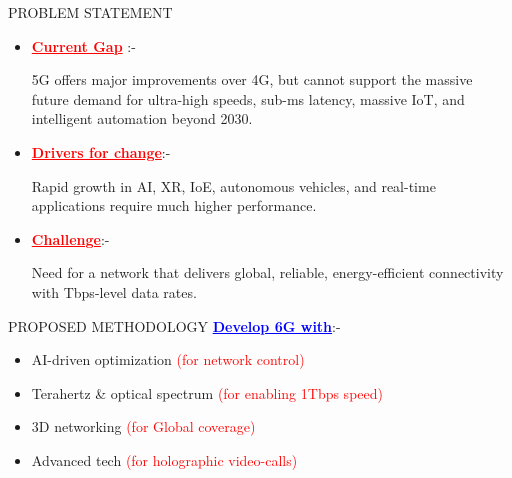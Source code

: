 \documentclass{beamer}
\begin{document}
\begin{frame}{PROBLEM STATEMENT}
\begin{itemize}
    \item \textcolor{red}{\underline{\textbf{Current Gap}}} :-
    
    5G offers major improvements over 4G, but cannot support the massive future demand for ultra-high speeds, sub-ms latency, massive IoT, and intelligent automation beyond 2030.
    \item \textcolor{red}{\underline{\textbf{Drivers for change}}}:-
    
    Rapid growth in AI, XR, IoE, autonomous vehicles, and real-time applications require much higher performance.
    \item \textcolor{red}{\underline{\textbf{Challenge}}}:-

    Need for a network that delivers global, reliable, energy-efficient connectivity with Tbps-level data rates.
\end{itemize}
    \end{frame}
\begin{frame}{PROPOSED METHODOLOGY}
     \textcolor{blue}{\underline{\textbf{Develop 6G with}}}:-
\begin{itemize}
     \item AI-driven optimization \textcolor{red}{(for network control)}
     \item Terahertz \& optical spectrum \textcolor{red}{(for enabling 1Tbps speed)}
     \item 3D networking \textcolor{red}{(for Global coverage)}
     \item Advanced tech \textcolor{red}{(for holographic video-calls)}    
\end{itemize}   
\end{frame}
\end{document}
